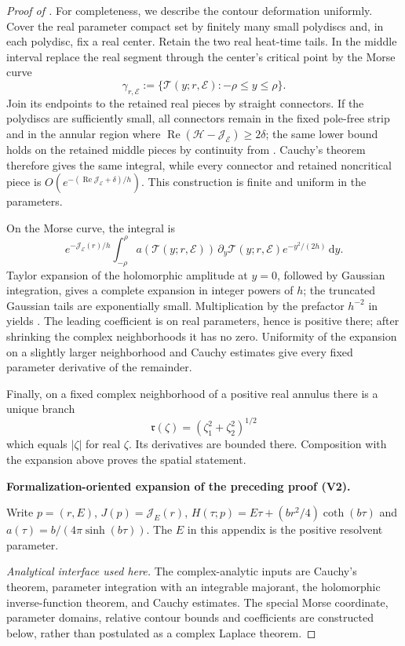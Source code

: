 \documentclass[11pt]{article}
\newcommand{\formalisationparentid}{X}
\newenvironment{formalisationaddition}[1]{\par\medskip\begingroup\color{blue}\def\formalisationparentid{#1}\setcounter{formalizationsublemma}{0}\let\lemma\formalizationsublemma\let\endlemma\endformalizationsublemma
  \def\Eo{\mathcal E_h^\circ}\def\EE{\mathcal E_h}\def\phio{\phi_h^\circ}\def\phih{\phi_h}\def\Ho{H_h^{\rm atom}(v^\circ)}\def\Ha{H_h^{\rm atom}}\def\HL{H_h^{L}}\def\Dh{D_h}\def\Log{\operatorname{Log}}\def\ellh{\ell_h}\def\Gp{G_{p,h}}\def\Ast{A_{*,h}}\def\ahat{\widehat{\mathfrak a}_h}\def\ah{\mathfrak a_h}\def\rh{\widehat\rho_h}\def\deltah{\widehat\delta_h}\def\oldref##1{\textup{(##1)}}\def\interface##1{\par\noindent\textit{Analytical interface used here.} ##1\par}\def\finish{\par\noindent\textit{Conclusion of the formalization-oriented expansion.} }\par\noindent\textbf{Formalization-oriented expansion of the preceding proof (V2).}\par\smallskip
}{\par\endgroup\medskip
}
\newcommand{\dd}{\,\mathrm d}
\newcommand{\cE}{\mathcal E}
\newcommand{\cJ}{\mathcal J}
\newcommand{\Rea}{\operatorname{Re}}
\begin{document}
\begin{proof}[Proof of ]
For completeness, we describe the contour deformation uniformly.  Cover the
real parameter compact set by finitely many small polydiscs and, in each
polydisc, fix a real center.  Retain the two real heat-time tails.  In the
middle interval replace the real segment through the center's critical point
by the Morse curve
\[
 \gamma_{r,\cE}:=\{\mathcal T(y;r,\cE):-\rho\le y\le\rho\}.
\]
Join its endpoints to the retained real pieces by straight connectors.  If
the polydiscs are sufficiently small, all connectors remain in the fixed
pole-free strip and in the annular region where
$\Rea(\mathcal H-\cJ_\cE)\ge2\delta$; the same lower bound holds on the
retained middle pieces by continuity from
.  Cauchy's theorem therefore gives the
same integral, while every connector and retained noncritical piece is
$O(e^{-(\Rea\cJ_\cE+\delta)/h})$.  This construction is finite and uniform in
the parameters.

On the Morse curve, the integral is
\[
 e^{-\cJ_\cE(r)/h}
 \int_{-\rho}^{\rho}
 a(\mathcal T(y;r,\cE))\,\partial_y\mathcal T(y;r,\cE)
 e^{-y^2/(2h)}\dd y.
\]
Taylor expansion of the holomorphic amplitude at $y=0$, followed by Gaussian
integration, gives a complete expansion in integer powers of $h$; the
truncated Gaussian tails are exponentially small.  Multiplication by the
prefactor $h^{-2}$ in  yields
.  The leading coefficient is
 on real parameters, hence is positive there; after shrinking
the complex neighborhoods it has no zero.  Uniformity of the expansion on a
slightly larger neighborhood and Cauchy estimates give every fixed
parameter derivative of the remainder.

Finally, on a fixed complex neighborhood of a positive real annulus there is
a unique branch
\[
 \mathfrak r(\zeta)=(\zeta_1^2+\zeta_2^2)^{1/2}
\]
which equals $|\zeta|$ for real $\zeta$.  Its derivatives are bounded there.
Composition with the expansion above proves the spatial statement.

\begin{formalisationaddition}{C-T6.1}
Write $p=(r,E)$, $J(p)=\cJ_E(r)$,
$H(\tau;p)=E\tau+(br^2/4)\coth(b\tau)$ and
$a(\tau)=b/(4\pi\sinh(b\tau))$.
The $E$ in this appendix is the positive resolvent parameter.

\interface{The complex-analytic inputs are Cauchy's theorem,
parameter integration with an integrable majorant, the holomorphic
inverse-function theorem, and Cauchy estimates. The special Morse
coordinate, parameter domains, relative contour bounds and coefficients
are constructed below, rather than postulated as a complex Laplace theorem.}


\end{formalisationaddition}
\end{proof}
\end{document}
